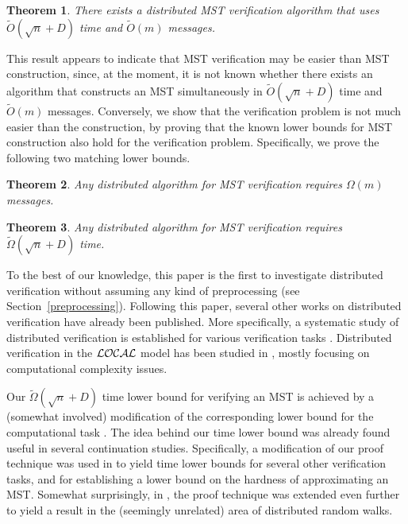 \documentclass[11pt,letter]{article}
\def\tO{{\tilde{O}}}
\newtheorem{theorem}{Theorem}[section]
\begin{document}
\begin{theorem}
\label{thm:upper-bound}
There exists a distributed MST verification algorithm that uses
$\tO(\sqrt{n} + D)$ time and $\tO(m)$ messages.
\end{theorem}


This result appears to indicate that MST verification may be easier than 
MST construction, since, at the moment,  it is not known whether there exists an algorithm that constructs an MST simultaneously in $\tO(\sqrt{n} + D)$ time and $\tO(m)$ messages. 
Conversely, we show that the verification problem 
is not much easier than the construction, by proving that the known lower bounds for MST construction
also hold for the verification problem. Specifically, we prove the following two matching lower bounds.

 
\begin{theorem} 
\label{thm:lower-bound-msgs}
Any distributed algorithm for 
MST verification 
requires ${\Omega}(m)$ messages.
\end{theorem}

\begin{theorem} 
\label{thm:lower-bound-time}
Any distributed algorithm for 
MST verification 
requires $\tilde{\Omega}(\sqrt{n} + D)$ time.
\end{theorem}


To the best of our knowledge, this paper is the first to investigate
distributed verification  without assuming any kind of preprocessing (see Section~\ref{preprocessing}). Following this paper, several other works on distributed verification have already been published. More specifically, a systematic study of distributed verification is established for various verification tasks \cite{DHKKNPPW}. Distributed verification in the $\cal{LOCAL}$ model has been studied in \cite{FKP11,FKPP12}, mostly focusing on computational complexity issues.

Our $\tilde{\Omega}(\sqrt{n} + D)$ time lower bound for verifying an MST is achieved by a (somewhat involved) 
modification of the corresponding lower bound for the computational task 
\cite{PR_00}. 
The idea behind our time lower bound was already found useful in several 
continuation studies. Specifically, a modification of our proof technique 
was used in \cite{DHKKNPPW} to yield time lower bounds for several other 
verification tasks, and for establishing a lower bound on the hardness 
of approximating an MST. Somewhat surprisingly, in \cite{NDP11}, 
the proof technique was extended even further to yield a result 
in the (seemingly unrelated) area of distributed random walks. 
\end{document}
